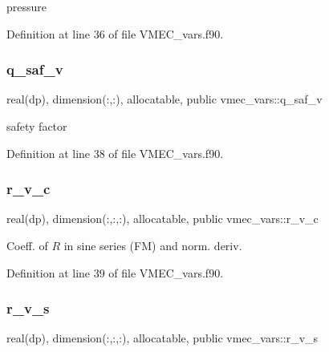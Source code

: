 pressure 



Definition at line 36 of file V\+M\+E\+C\+\_\+vars.\+f90.

\mbox{\label{namespacevmec__vars_a08f3862b0bb940623a416a056f03b092}} 
\subsubsection{\texorpdfstring{q\+\_\+saf\+\_\+v}{q\_saf\_v}}
{\footnotesize\ttfamily real(dp), dimension(\+:,\+:), allocatable, public vmec\+\_\+vars\+::q\+\_\+saf\+\_\+v}



safety factor 



Definition at line 38 of file V\+M\+E\+C\+\_\+vars.\+f90.

\mbox{\label{namespacevmec__vars_a8307a4a411dadf5b9be24f8aafac5f39}} 
\subsubsection{\texorpdfstring{r\+\_\+v\+\_\+c}{r\_v\_c}}
{\footnotesize\ttfamily real(dp), dimension(\+:,\+:,\+:), allocatable, public vmec\+\_\+vars\+::r\+\_\+v\+\_\+c}



Coeff. of $R$ in sine series (FM) and norm. deriv. 



Definition at line 39 of file V\+M\+E\+C\+\_\+vars.\+f90.

\mbox{\label{namespacevmec__vars_ac6cdafd632e37856533c42e8ab34a680}} 
\subsubsection{\texorpdfstring{r\+\_\+v\+\_\+s}{r\_v\_s}}
{\footnotesize\ttfamily real(dp), dimension(\+:,\+:,\+:), allocatable, public vmec\+\_\+vars\+::r\+\_\+v\+\_\+s}



